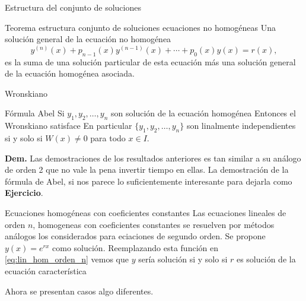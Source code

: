 \documentclass[handout,hyperref={colorlinks=true}]{beamer}
\begin{document}
\begin{frame}{Estructura del conjunto de soluciones}
\begin{block}{Teorema estructura conjunto de soluciones ecuaciones no homogéneas}
Una solución general de la ecuación no homogénea  
\[y^{(n)}(x)+p_{n-1}(x)y^{(n-1)}(x)+\cdots+p_0(x)y(x)=r(x),\]
es la suma de una solución particular de esta ecuación más una solución general de la ecuación homogénea asociada.
\end{block}

\end{frame}




\begin{frame}{Wronskiano}
\begin{block}{Fórmula Abel}
Si $y_1,y_2,\ldots,y_n$ son solución de la ecuación  homogénea  
Entonces el Wronskiano satisface
En particular  $\{y_1,y_2,\ldots,y_n\}$ son linalmente independientes si y solo si $W(x)\neq 0$ para todo $x\in I$.
\end{block}

\textbf{Dem.} Las demostraciones de los resultados anteriores es tan similar a su análogo de orden 2 que no vale la pena invertir tiempo en ellas. La demostración de la fórmula de Abel, si nos parece lo suficientemente interesante para dejarla como \textbf{Ejercicio}.
\end{frame}


\begin{frame}{Ecuaciones homogéneas con coeficientes constantes}
Las ecuaciones lineales de orden $n$, homogeneas con coeficientes constantes  se resuelven por métodos análogos los considerados para eciaciones de segundo orden. Se propone $y(x)=e^{rx}$ como solución. Reemplazando esta función
en \eqref{eq:lin_hom_orden_n} vemos que $y$ sería solución si y solo si $r$ es solución de la ecuación característica
 
Ahora se presentan casos algo diferentes.


\end{frame}
\end{document}
